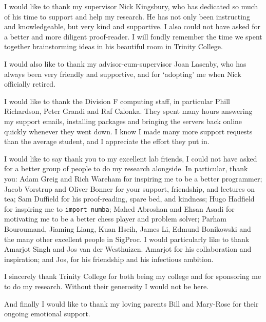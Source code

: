 
\begin{acknowledgements}

  I would like to thank my supervisor Nick Kingsbury, who has dedicated so
  much of his time to support and help my research. He has not only been instructing and
  knowledgeable, but very kind and supportive. I also could not have asked for a
  better and more diligent proof-reader. I will fondly remember the time
  we spent together brainstorming ideas in his beautiful room in Trinity
  College.
  
  I would also like to thank my advisor-cum-supervisor Joan Lasenby, who has always
  been very friendly and supportive, and for `adopting' me when Nick officially
  retired.

  I would like to thank the Division F computing staff, in particular Phill
  Richardson, Peter Grandi and Raf Czlonka. They spent many hours answering my
  support emails, installing packages and bringing
  the servers back online quickly whenever they went down. I know I made many
  more support requests than the average student, and I appreciate the effort
  they put in.

  I would like to say thank you to my excellent lab friends, I could not have asked for a better group of
  people to do my research alongside. In particular, thank you: Adam Greig and Rich Wareham
  for inspiring me to be a better programmer; Jacob Vorstrup and Oliver Bonner 
  for your support, friendship, and lectures on tea; Sam Duffield for his
  proof-reading, spare bed, and kindness; Hugo Hadfield for
  inspiring me to \texttt{import numba}; Mahed Abroshan and Ehsan Asadi for
  motivating me to be a better chess player and problem solver; Parham Bouroumand, 
  Jiaming Liang, Kuan Hseih, James Li, Edmund Bonikowski and the many other
  excellent people in SigProc. I would particularly like to thank Amarjot Singh
  and Jos van der Westhuizen. Amarjot for his collaboration and inspiration; and Jos, 
  for his friendship and his infectious ambition.
  
  I sincerely thank Trinity College for both being my college and
  for sponsoring me to do my research. Without their generosity I would not be
  here.

  And finally I would like to thank my loving parents
  Bill and Mary-Rose for their ongoing emotional support.
\end{acknowledgements}
